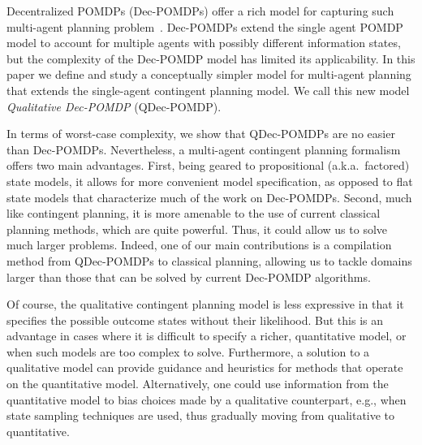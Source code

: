 \documentclass[letterpaper]{article}
\theoremstyle{definition}
\begin{document}
Decentralized POMDPs (Dec-POMDPs) offer a rich model for capturing such multi-agent planning problem~\cite{Bernstein02,Seuken08}. Dec-POMDPs extend the single agent POMDP model to account for multiple agents with possibly different information states, but the complexity of the Dec-POMDP model has limited its applicability.  In this paper we define and study a conceptually simpler model for multi-agent planning that extends the single-agent contingent planning model.  We call this new model \emph{Qualitative Dec-POMDP} (QDec-POMDP).


In terms of worst-case complexity, we show that QDec-POMDPs are no easier than Dec-POMDPs. %
Nevertheless, a multi-agent contingent planning formalism offers two main advantages. First, being geared to propositional (a.k.a.~factored) state models, it allows for more convenient model specification, as opposed to flat state models that characterize much of the work on Dec-POMDPs.  Second, much like contingent planning, it is more amenable to the use of current classical planning methods, which are quite powerful.
Thus, it could allow us to solve much larger problems. Indeed, one of our main contributions is a compilation method from QDec-POMDPs to classical planning, allowing us to tackle domains larger than those that can be solved by current Dec-POMDP algorithms.

Of course, the qualitative contingent planning model is less expressive in that it specifies the possible outcome states without their likelihood.  But this is an advantage in cases where it is difficult to specify a richer, quantitative model, or when such models are too complex to solve.  Furthermore, a solution to a qualitative model can provide guidance and heuristics for methods that operate on the quantitative model.  Alternatively, one could use information from the quantitative model to bias choices made by a qualitative counterpart, e.g., when state sampling techniques are used, thus gradually moving from qualitative to quantitative.
\end{document}
